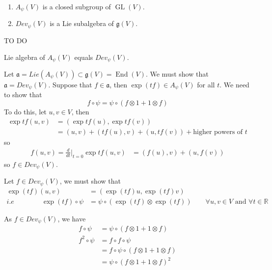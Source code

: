 \documentclass[11pt,a4paper]{scrarticle}
\theoremstyle{definition}
\renewenvironment{proof}[1][\proofname]{\vspace{-10pt}\begin{myproof}}{\end{myproof}}
\theoremstyle{greenbox}
\newcommand{\R}{\mathbb{R}}
\newcommand{\ag}{\mathfrak{a}}
\newcommand{\fg}{\mathfrak{g}}
\begin{document}
\begin{proposition}
    \begin{enumerate}
        \item $ A_{\psi}(V) $ is a closed subgroup of $ \operatorname{GL}(V) $. 
        \item $ Dev_{\psi}(V) $ is a Lie subalgebra of $ \fg(V) $.
    \end{enumerate}
\end{proposition}
\begin{proof}
    TO DO
\end{proof}
\begin{thm}
    Lie algebra of $ A_{\psi}(V) $ equals $ Dev_{\psi}(V) $.
\end{thm}
\begin{proof}
    Let $ \ag = Lie(A_{\psi}(V)) \subset \fg(V) = \operatorname{End}(V)$. We must show that $ \ag = Dev_{\psi}(V) $. Suppose that $ f \in \ag $, then $ \exp(tf) \in A_{\psi}(V) $ for all $ t $. We need to show that 
    \[ f \circ \psi = \psi \circ (f \otimes 1 + 1 \otimes f) \]
    To do this, let $ u,v \in V $, then \begin{align*}
        \exp tf (u,v) & = (\exp tf (u), \exp tf (v)) \\
        & = (u,v)+ (t f(u), v)+ (u, t f(v)) + \text{higher powers of }t
    \end{align*}
    so \begin{align*}
        f(u,v) = \frac{d}{dt}\bigg|_{t=0} \exp tf (u,v) & = (f(u),v)+ (u, f(v))
    \end{align*}
    so $ f \in Dev_{\psi}(V) $. 

    Let $ f \in Dev_{\psi}(V)  $, we must show that \begin{align*}
        \exp (tf) (u,v) & = ( \exp (tf) u, \exp(tf) v) \\
        i.e \qquad \qquad \exp (tf) \circ \psi & = \psi \circ ( \exp (tf) \otimes \exp (tf)) \qquad \forall u,v \in V \text{ and } \forall t \in \R
    \end{align*}

    As $ f \in Dev_{\psi}(V) $, we have \begin{align*}
        f \circ \psi & = \psi \circ ( f \otimes 1+ 1 \otimes f) \\
        f^{2} \circ \psi & = f \circ f \circ \psi \\
        & = f \circ \psi \circ ( f \otimes 1 + 1 \otimes f) \\
        & = \psi \circ ( f \otimes 1 + 1 \otimes f)^{2} 
    \end{align*}


\end{proof}
\end{document}
